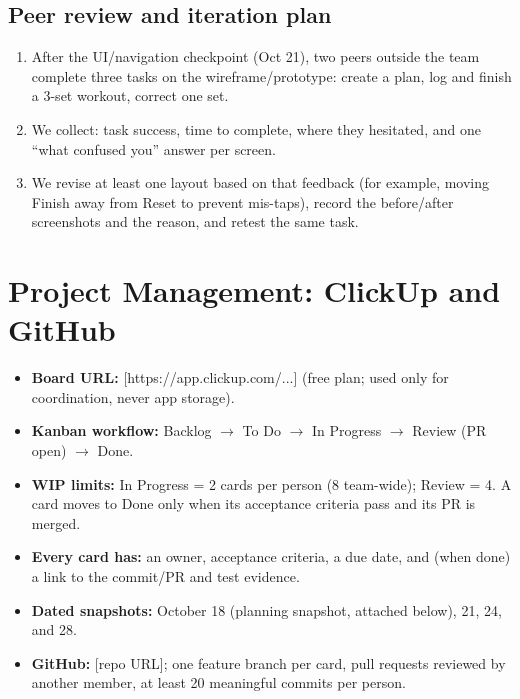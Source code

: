 \documentclass[11pt]{article}
\newcommand{\ph}[1]{\textcolor{ph}{[#1]}}
\begin{document}
\subsection{Peer review and iteration plan}
\begin{enumerate}
  \item After the UI/navigation checkpoint (Oct 21), two peers outside the team complete three tasks on the wireframe/prototype: create a plan, log and finish a 3-set workout, correct one set.
  \item We collect: task success, time to complete, where they hesitated, and one ``what confused you'' answer per screen.
  \item We revise at least one layout based on that feedback (for example, moving Finish away from Reset to prevent mis-taps), record the before/after screenshots and the reason, and retest the same task.
\end{enumerate}

\section{Project Management: ClickUp and GitHub}

\begin{itemize}
  \item \textbf{Board URL:} \ph{https://app.clickup.com/...} (free plan; used only for coordination, never app storage).
  \item \textbf{Kanban workflow:} Backlog $\rightarrow$ To Do $\rightarrow$ In Progress $\rightarrow$ Review (PR open) $\rightarrow$ Done.
  \item \textbf{WIP limits:} In Progress = 2 cards per person (8 team-wide); Review = 4. A card moves to Done only when its acceptance criteria pass and its PR is merged.
  \item \textbf{Every card has:} an owner, acceptance criteria, a due date, and (when done) a link to the commit/PR and test evidence.
  \item \textbf{Dated snapshots:} October 18 (planning snapshot, attached below), 21, 24, and 28.
  \item \textbf{GitHub:} \ph{repo URL}; one feature branch per card, pull requests reviewed by another member, at least 20 meaningful commits per person.
\end{itemize}
\end{document}
